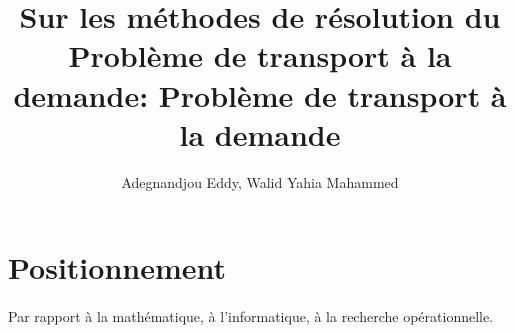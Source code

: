 \documentclass{article}
\begin{document}
\title{Sur les méthodes de résolution du Problème de transport à la demande: Problème de transport à la demande}
\author{Adegnandjou Eddy, Walid Yahia Mahammed}

\maketitle

\newpage

\section*{Positionnement}

\paragraph{}
Par rapport à la mathématique, à l'informatique, à la recherche opérationnelle.
\end{document}
